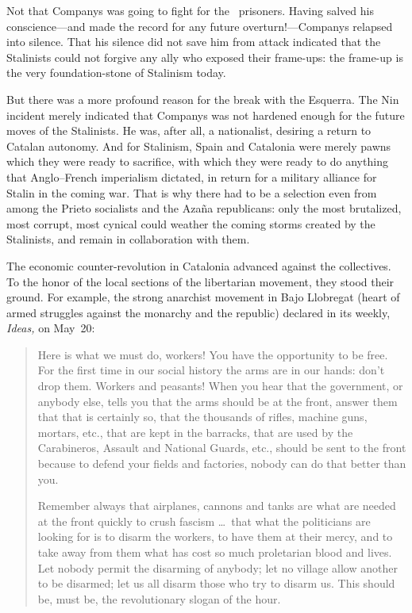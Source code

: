 Not that Companys was going to fight for the \POUM\ prisoners. Having salved his conscience---and made the record for any future overturn!---Companys relapsed into silence. That his silence did not save him from attack indicated that the Stalinists could not forgive any ally who exposed their frame-ups: the frame-up is the very foundation-stone of Stalinism today.

But there was a more profound reason for the break with the Esquerra. The Nin incident merely indicated that Companys was not hardened enough for the future moves of the Stalinists. He was, after all, a nationalist, desiring a return to Catalan autonomy. And for Stalinism, Spain and Catalonia were merely pawns which they were ready to sacrifice, with which they were ready to do anything that Anglo--French imperialism dictated, in return for a military alliance for Stalin in the coming war. That is why there had to be a selection even from among the Prieto socialists and the Azaña republicans: only the most brutalized, most corrupt, most cynical could weather the coming storms created by the Stalinists, and remain in collaboration with them.

The economic counter-revolution in Catalonia advanced against the collectives. To the honor of the local sections of the libertarian movement, they stood their ground. For example, the strong anarchist  movement in Bajo Llobregat (heart of armed struggles against the monarchy and the republic) declared in its weekly, \emph{Ideas,} on May~20:

\begin{quotation}
  Here is what we must do, workers! You have the opportunity to be free. For the first time in our social history the arms are in our hands: don’t drop them. Workers and peasants! When you hear that the government, or anybody else, tells you that the arms should be at the front, answer them that that is certainly so, that the thousands of rifles, machine guns, mortars, etc., that are kept in the barracks, that are used by the Carabineros, Assault and National Guards, etc., should be sent to the front because to defend your fields and factories, nobody can do that better than you.
  
  Remember always that airplanes, cannons and tanks are what are needed at the front quickly to crush fascism \dots\ that what the politicians are looking for is to disarm the workers, to have them at their mercy, and to take away from them what has cost so much proletarian blood and lives. Let nobody permit the disarming of anybody; let no village allow another to be disarmed; let us all disarm those who try to disarm us. This should be, must be, the revolutionary slogan of the hour.
\end{quotation}

